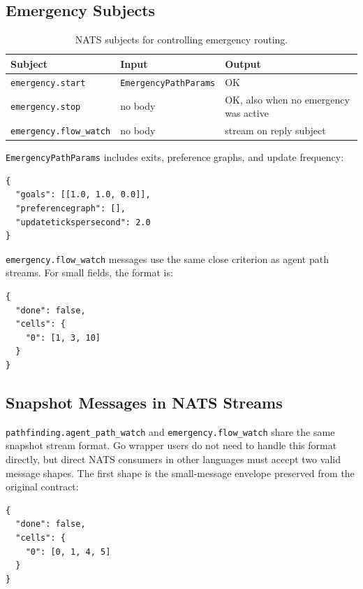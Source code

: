 \documentclass[12pt,a4paper]{report}
\begin{document}
\subsection{Emergency Subjects}

\begin{table}[H]
\centering
\small
\begin{tabular}{|p{}|p{}|p{}|}
\hline
\textbf{Subject} & \textbf{Input} & \textbf{Output} \\
\hline
\texttt{emergency.start} &
\texttt{EmergencyPathParams} &
OK \\
\hline
\texttt{emergency.stop} &
no body &
OK, also when no emergency was active \\
\hline
\texttt{emergency.}\newline\texttt{flow\_watch} &
no body &
stream on reply subject \\
\hline
\end{tabular}
\caption{NATS subjects for controlling emergency routing.}
\end{table}

\texttt{EmergencyPathParams} includes exits, preference graphs, and update
frequency:

\begin{lstlisting}
{
  "goals": [[1.0, 1.0, 0.0]],
  "preferencegraph": [],
  "updatetickspersecond": 2.0
}
\end{lstlisting}

\texttt{emergency.flow\_watch} messages use the same close criterion as agent
path streams. For small fields, the format is:

\begin{lstlisting}
{
  "done": false,
  "cells": {
    "0": [1, 3, 10]
  }
}
\end{lstlisting}

\subsection{Snapshot Messages in NATS Streams}

\texttt{pathfinding.agent\_path\_watch} and \texttt{emergency.flow\_watch} share
the same snapshot stream format. Go wrapper users do not need to handle this
format directly, but direct NATS consumers in other languages must accept two
valid message shapes.
The first shape is the small-message envelope preserved from the original
contract:

\begin{lstlisting}
{
  "done": false,
  "cells": {
    "0": [0, 1, 4, 5]
  }
}
\end{lstlisting}
\end{document}
